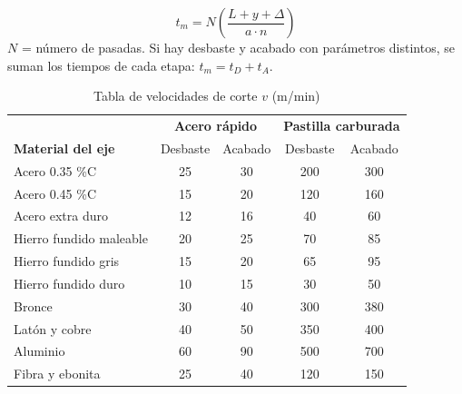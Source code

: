 \documentclass[12pt,a4paper]{article}
\begin{document}
\begin{formu}
	\[ t_m = N\left(\frac{L + y + \Delta}{a\cdot n}\right) \]
	$N$ = número de pasadas. Si hay desbaste y acabado con parámetros distintos,
	se suman los tiempos de cada etapa: $t_m = t_D + t_A$.
\end{formu}

\begin{table}[H]
	\centering
	\small
	\caption{Tabla de velocidades de corte $v$ (m/min)}
	\vspace{10pt}
	\begin{tabular}{@{}lcccc@{}}
		\toprule
		                          & \multicolumn{2}{c}{\textbf{Acero rápido}} &
		\multicolumn{2}{c}{\textbf{Pastilla carburada}}
		\\
		\textbf{Material del eje} & Desbaste                                  &
		Acabado                   & Desbaste                                  &
		Acabado
		\\
		\midrule
		Acero 0.35 \%C            & 25                                        & 30
		                          & 200                                       & 300
		\\
		Acero 0.45 \%C            & 15                                        & 20
		                          & 120                                       & 160
		\\
		Acero extra duro          & 12                                        & 16
		                          & 40                                        & 60
		\\
		Hierro fundido maleable   & 20                                        & 25
		                          & 70                                        & 85
		\\
		Hierro fundido gris       & 15                                        & 20
		                          & 65                                        & 95
		\\
		Hierro fundido duro       & 10                                        & 15
		                          & 30                                        & 50
		\\
		Bronce                    & 30                                        & 40
		                          & 300                                       & 380
		\\
		Latón y cobre             & 40                                        & 50
		                          & 350                                       & 400
		\\
		Aluminio                  & 60                                        & 90
		                          & 500                                       & 700
		\\
		Fibra y ebonita           & 25                                        & 40
		                          & 120                                       & 150 \\
		\bottomrule
	\end{tabular}
\end{table}
\end{document}
